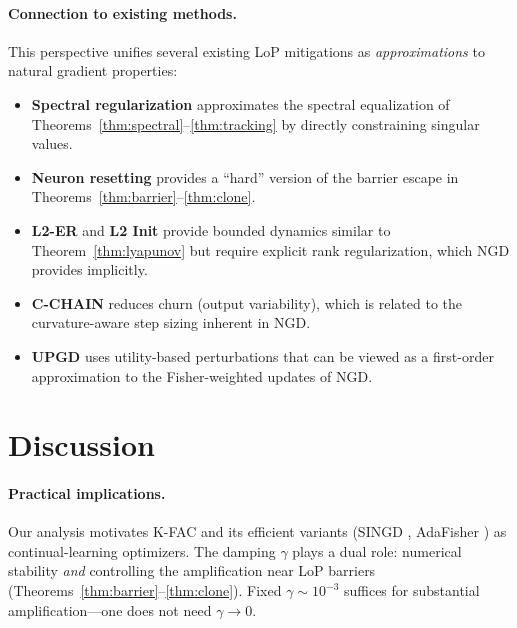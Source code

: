 \documentclass{article}
\theoremstyle{plain}
\theoremstyle{definition}
\theoremstyle{remark}
\begin{document}
\paragraph{Connection to existing methods.} This perspective unifies several existing LoP mitigations as \emph{approximations} to natural gradient properties:
\begin{itemize}
    \item \textbf{Spectral regularization} \citep{lewandowski2025spectral} approximates the spectral equalization of Theorems~\ref{thm:spectral}--\ref{thm:tracking} by directly constraining singular values.
    \item \textbf{Neuron resetting} \citep{sokar2023dormant, farias2025snr} provides a ``hard'' version of the barrier escape in Theorems~\ref{thm:barrier}--\ref{thm:clone}.
    \item \textbf{L2-ER} \citep{he2025spectral} and \textbf{L2 Init} \citep{kumar2025l2init} provide bounded dynamics similar to Theorem~\ref{thm:lyapunov} but require explicit rank regularization, which NGD provides implicitly.
    \item \textbf{C-CHAIN} \citep{tang2025mitigating} reduces churn (output variability), which is related to the curvature-aware step sizing inherent in NGD.
    \item \textbf{UPGD} \citep{elsayed2024upgd} uses utility-based perturbations that can be viewed as a first-order approximation to the Fisher-weighted updates of NGD.
\end{itemize}

\section{Discussion}
\label{sec:discussion}

\paragraph{Practical implications.}
Our analysis motivates K-FAC and its efficient variants (SINGD \citep{lin2024singd}, AdaFisher \citep{adafisher2025}) as continual-learning optimizers. The damping $\gamma$ plays a dual role: numerical stability \emph{and} controlling the amplification near LoP barriers (Theorems~\ref{thm:barrier}--\ref{thm:clone}). Fixed $\gamma \sim 10^{-3}$ suffices for substantial amplification---one does not need $\gamma \to 0$.
\end{document}
